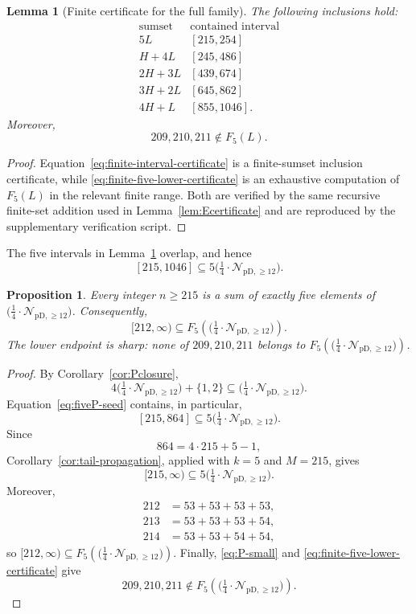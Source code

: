\documentclass[12pt]{article}
\theoremstyle{plain}
\newtheorem{proposition}[theorem]{Proposition}
\newtheorem{lemma}[theorem]{Lemma}
\theoremstyle{definition}
\theoremstyle{plain}
\newcommand{\Pset}{%
  \bigl(\tfrac{1}{4}\cdot\mathcal{N}_{\mathrm{pD},\geq 12}\bigr)%
}
\begin{document}
\begin{lemma}[Finite certificate for the full family]\label{lem:finitefive}
The following inclusions hold:
\begin{equation}\label{eq:finite-interval-certificate}
\begin{array}{c|c}
\text{sumset}&\text{contained interval}\\ \hline
5L &[215,254]\\
H+4L &[245,486]\\
2H+3L &[439,674]\\
3H+2L &[645,862]\\
4H+L &[855,1046].
\end{array}
\end{equation}
Moreover,
\begin{equation}\label{eq:finite-five-lower-certificate}
 209,210,211\notin F_5(L).
\end{equation}
\end{lemma}

\begin{proof}
Equation~\eqref{eq:finite-interval-certificate} is a finite-sumset
inclusion certificate, while \eqref{eq:finite-five-lower-certificate}
is an exhaustive computation of $F_5(L)$ in the relevant finite range.
Both are verified by the same recursive finite-set addition used in
Lemma~\ref{lem:Ecertificate} and are reproduced by the supplementary
verification script.
\end{proof}

The five intervals in Lemma~\ref{lem:finitefive} overlap, and hence
\begin{equation}\label{eq:fiveP-seed}
 [215,1046]\subseteq5\Pset.
\end{equation}

\begin{proposition}\label{prop:fiveP}
Every integer $n\geq215$ is a sum of exactly five elements of $\Pset$.
Consequently,
\[
 [212,\infty)\subseteq F_5(\Pset).
\]
The lower endpoint is sharp: none of $209,210,211$ belongs to
$F_5(\Pset)$.
\end{proposition}

\begin{proof}
By Corollary~\ref{cor:Pclosure},
\[
 4\Pset+\{1,2\}\subseteq\Pset.
\]
Equation~\eqref{eq:fiveP-seed} contains, in particular,
\[
 [215,864]\subseteq5\Pset.
\]
Since
\[
 864=4\cdot215+5-1,
\]
Corollary~\ref{cor:tail-propagation}, applied with $k=5$ and $M=215$,
gives
\[
 [215,\infty)\subseteq5\Pset.
\]
Moreover,
\[
\begin{aligned}
212&=53+53+53+53,\\
213&=53+53+53+54,\\
214&=53+53+54+54,
\end{aligned}
\]
so $[212,\infty)\subseteq F_5(\Pset)$.  Finally,
\eqref{eq:P-small} and \eqref{eq:finite-five-lower-certificate} give
\[
 209,210,211\notin F_5(\Pset).
\]
\end{proof}
\end{document}
